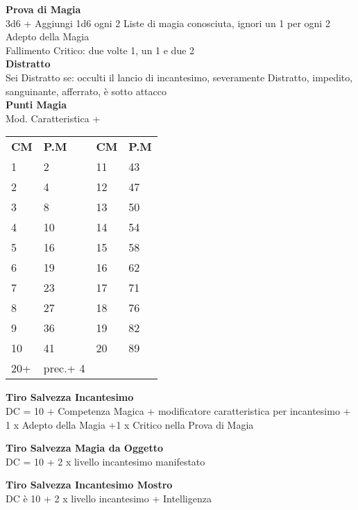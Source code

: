 \documentclass[landscape,10pt,a4paper]{article}
\begin{document}
\begin{multicols}{2}
	



	
	
	
	


	\textbf{Prova di Magia}\\
	3d6 + Aggiungi 1d6 ogni 2 Liste di magia conosciuta, ignori un 1 per ogni 2 Adepto della Magia\\
	Fallimento Critico: due volte 1, un 1 e due 2\\
	
	
	
	
	\textbf{Distratto}\\
	Sei Distratto se: occulti il lancio di incantesimo, severamente Distratto, impedito, sanguinante, afferrato, è sotto attacco\\
	
	
	
	\textbf{Punti Magia}\\
	Mod. Caratteristica + \\
	
	\begin{tabular}{ll|ll}
		\textbf{CM} & \textbf{P.M}&	\textbf{CM} & \textbf{P.M}\\
		1&	2 	&11&43\\
		2&	4	&12&47\\
		3&	8	&13&50\\
		4&	10	&14&54\\
		5&	16	&15&58\\
		6&	19	&16&62\\
		7&	23	&17&71\\
		8&	27	&18&76\\
		9&	36	&19&82\\
		10&	41	&20&89\\
		20+&prec.+ 4&&\\
	\end{tabular}
	
	
	
	\textbf{Tiro Salvezza Incantesimo}\\
	DC = 10 + Competenza Magica + modificatore caratteristica per incantesimo + 1 x Adepto della Magia +1 x Critico nella Prova di Magia
	
	
	
	\textbf{Tiro Salvezza Magia da Oggetto}\\
	DC = 10 + 2 x livello incantesimo manifestato
	
	
	
	\textbf{Tiro Salvezza Incantesimo Mostro}\\
	DC è 10 + 2 x livello incantesimo + Intelligenza
	

\end{multicols}
\end{document}

